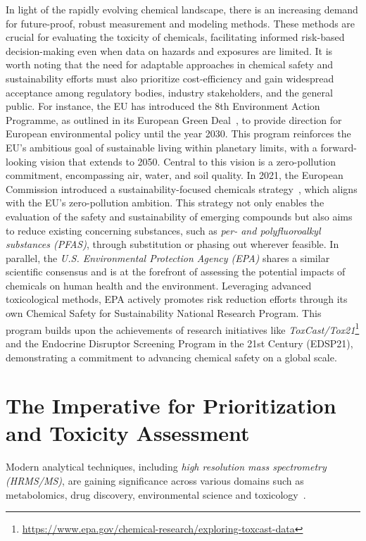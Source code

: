 In light of the rapidly evolving chemical landscape, there is an increasing demand for future-proof, robust measurement and modeling methods. These methods are crucial for evaluating the toxicity of chemicals, facilitating informed risk-based decision-making even when data on hazards and exposures are limited. It is worth noting that the need for adaptable approaches in chemical safety and sustainability efforts must also prioritize cost-efficiency and gain widespread acceptance among regulatory bodies, industry stakeholders, and the general public. For instance, the EU has introduced the 8th Environment Action Programme, as outlined in its European Green Deal~\cite{greendeal}, to provide direction for European environmental policy until the year 2030. This program reinforces the EU's ambitious goal of sustainable living within planetary limits, with a forward-looking vision that extends to 2050. Central to this vision is a zero-pollution commitment, encompassing air, water, and soil quality. In 2021, the European Commission introduced a sustainability-focused chemicals strategy~\cite{EUChemicalsStrategy}, which aligns with the EU's zero-pollution ambition. This strategy not only enables the evaluation of the safety and sustainability of emerging compounds but also aims to reduce existing concerning substances, such as \emph{per- and polyfluoroalkyl substances (PFAS)}, through substitution or phasing out wherever feasible. In parallel, the \emph{U.S. Environmental Protection Agency (EPA)} shares a similar scientific consensus and is at the forefront of assessing the potential impacts of chemicals on human health and the environment. Leveraging advanced toxicological methods, EPA actively promotes risk reduction efforts through its own Chemical Safety for Sustainability National Research Program. This program builds upon the achievements of research initiatives like \emph{ToxCast/Tox21}\footnote{\url{https://www.epa.gov/chemical-research/exploring-toxcast-data}} and the Endocrine Disruptor Screening Program in the 21st Century (EDSP21), demonstrating a commitment to advancing chemical safety on a global scale.


\section{The Imperative for Prioritization and Toxicity Assessment}

Modern analytical techniques, including \emph{high resolution mass spectrometry (HRMS/MS)}, are gaining significance across various domains such as metabolomics, drug discovery, environmental science and toxicology~\cite{tamara2022}.


